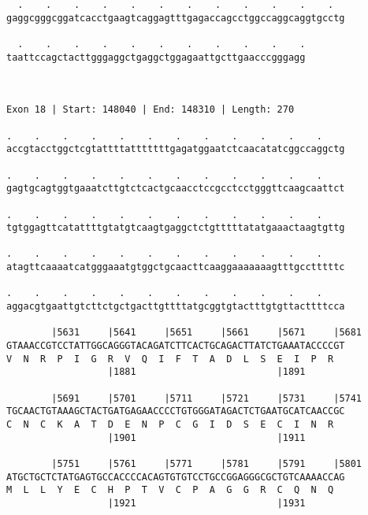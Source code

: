 \documentclass{article}
\begin{document}
\begin{Verbatim}
  .    .    .    .    .    .    .    .    .    .    .    .  
gaggcgggcggatcacctgaagtcaggagtttgagaccagcctggccaggcaggtgcctg
                                                            
  .    .    .    .    .    .    .    .    .    .    .
taattccagctacttgggaggctgaggctggagaattgcttgaacccgggagg
                                                     
                                                     
 
Exon 18 | Start: 148040 | End: 148310 | Length: 270
 
.    .    .    .    .    .    .    .    .    .    .    .    
accgtacctggctcgtattttatttttttgagatggaatctcaacatatcggccaggctg
                                                            
.    .    .    .    .    .    .    .    .    .    .    .    
gagtgcagtggtgaaatcttgtctcactgcaacctccgcctcctgggttcaagcaattct
                                                            
.    .    .    .    .    .    .    .    .    .    .    .    
tgtggagttcatattttgtatgtcaagtgaggctctgtttttatatgaaactaagtgttg
                                                            
.    .    .    .    .    .    .    .    .    .    .    .    
atagttcaaaatcatgggaaatgtggctgcaacttcaaggaaaaaaagtttgcctttttc
                                                            
.    .    .    .    .    .    .    .    .    .    .    .    
aggacgtgaattgtcttctgctgacttgttttatgcggtgtactttgtgttacttttcca
                                                            
        |5631     |5641     |5651     |5661     |5671     |5681
GTAAACCGTCCTATTGGCAGGGTACAGATCTTCACTGCAGACTTATCTGAAATACCCCGT
V  N  R  P  I  G  R  V  Q  I  F  T  A  D  L  S  E  I  P  R  
                  |1881                         |1891       
  
        |5691     |5701     |5711     |5721     |5731     |5741
TGCAACTGTAAAGCTACTGATGAGAACCCCTGTGGGATAGACTCTGAATGCATCAACCGC
C  N  C  K  A  T  D  E  N  P  C  G  I  D  S  E  C  I  N  R  
                  |1901                         |1911       
  
        |5751     |5761     |5771     |5781     |5791     |5801
ATGCTGCTCTATGAGTGCCACCCCACAGTGTGTCCTGCCGGAGGGCGCTGTCAAAACCAG
M  L  L  Y  E  C  H  P  T  V  C  P  A  G  G  R  C  Q  N  Q  
                  |1921                         |1931       
  

\end{Verbatim}
\end{document}
